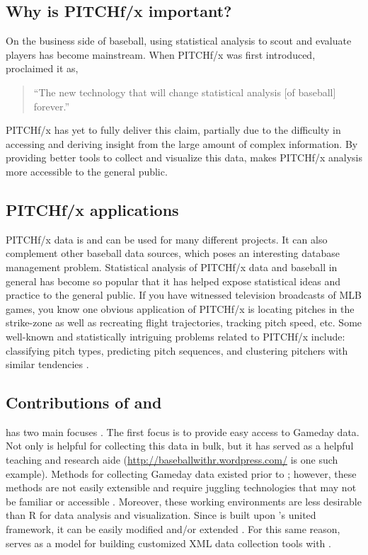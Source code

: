 \documentclass[a4paper]{report}\usepackage[]{graphicx}\usepackage[]{color}
\begin{document}
\begin{article}
\subsection{Why is PITCHf/x important?}

On the business side of baseball, using statistical analysis to scout
and evaluate players has become mainstream. When PITCHf/x was first
introduced, \citep{slate} proclaimed it as, \begin{quote} ``The new technology that will change statistical analysis [of baseball] forever.'' \end{quote}
PITCHf/x has yet to fully deliver this claim, partially due to the
difficulty in accessing and deriving insight from the large amount
of complex information. By providing better tools to collect and visualize
this data,  makes PITCHf/x analysis more accessible
to the general public.


\subsection{PITCHf/x applications}

PITCHf/x data is and can be used for many different projects. It can
also complement other baseball data sources, which poses an interesting
database management problem. Statistical analysis of PITCHf/x data
and baseball in general has become so popular that it has helped expose
statistical ideas and practice to the general public. If you have
witnessed television broadcasts of MLB games, you know one obvious
application of PITCHf/x is locating pitches in the strike-zone as
well as recreating flight trajectories, tracking pitch speed, etc.
Some well-known and statistically intriguing problems related to PITCHf/x
include: classifying pitch types, predicting pitch sequences, and
clustering pitchers with similar tendencies \citep{curve}.


\subsection{Contributions of  and }

 has two main focuses \citep{pitchRx}. The first focus
is to provide easy access to Gameday data. Not only is 
helpful for collecting this data in bulk, but it has served as a helpful
teaching and research aide (\url{http://baseballwithr.wordpress.com/}
is one such example). Methods for collecting Gameday data existed
prior to ; however, these methods are not easily extensible
and require juggling technologies that may not be familiar or accessible
\citep{database}. Moreover, these working environments are less desirable
than R for data analysis and visualization. Since  is
built upon 's united framework, it can be easily modified
and/or extended \citep{XML2R}. For this same reason, 
serves as a model for building customized XML data collection tools
with .


\end{article}
\end{document}
